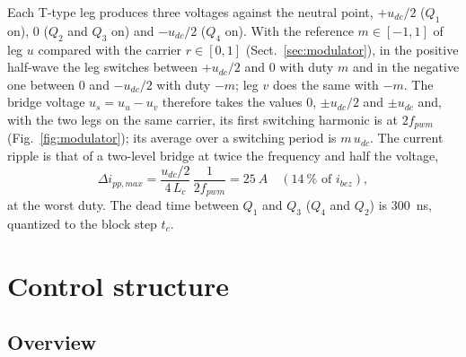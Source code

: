 \documentclass[10pt,a4paper]{scrartcl}
\newcommand{\tc}{t_c}
\begin{document}
\begin{onehalfspace}
Each T-type leg produces three voltages against the neutral point, $+u_{dc}/2$ ($Q_1$ on), $0$ ($Q_2$ and $Q_3$ on) and $-u_{dc}/2$ ($Q_4$ on). With the reference $m \in [-1, 1]$ of leg $u$ compared with the carrier $r \in [0, 1]$ (Sect.~\ref{sec:modulator}), in the positive half-wave the leg switches between $+u_{dc}/2$ and $0$ with duty $m$ and in the negative one between $0$ and $-u_{dc}/2$ with duty $-m$; leg $v$ does the same with $-m$. The bridge voltage $u_s = u_u - u_v$ therefore takes the values $0$, $\pm u_{dc}/2$ and $\pm u_{dc}$ and, with the two legs on the same carrier, its first switching harmonic is at $2f_{pwm}$ (Fig.~\ref{fig:modulator}); its average over a switching period is $m\,u_{dc}$. The current ripple is that of a two-level bridge at twice the frequency and half the voltage,
\begin{equation}
\Delta i_{pp,max} = \frac{u_{dc}/2}{4\,L_c}\,\frac{1}{2f_{pwm}} = \SI{25}{A} \quad (\SI{14}{\percent}\text{ of } i_{bez}),
\label{eq:ripple}
\end{equation}
at the worst duty. The dead time between $Q_1$ and $Q_3$ ($Q_4$ and $Q_2$) is \SI{300}{ns}, quantized to the block step $\tc$.

\section{Control structure}
\label{sec:structure}

\subsection{Overview}
\label{sec:overview}


\end{onehalfspace}
\end{document}
